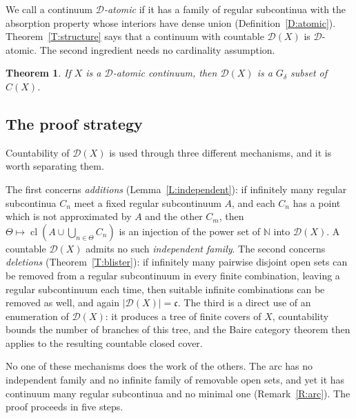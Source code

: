 \documentclass[11pt,reqno]{amsart}
\theoremstyle{plain}
\newtheorem{theorem}{Theorem}[section]
\theoremstyle{definition}
\theoremstyle{remark}
\newcommand{\D}{\mathcal{D}}
\newcommand{\cl}{\operatorname{cl}}
\newcommand{\N}{\mathbb{N}}
\newcommand{\cc}{\mathfrak{c}}
\begin{document}
We call a continuum \emph{$\D$-atomic} if it has a family of regular subcontinua with the absorption property whose interiors have dense union (Definition~\ref{D:atomic}). Theorem~\ref{T:structure} says that a continuum with countable $\D(X)$ is $\D$-atomic. The second ingredient needs no cardinality assumption.

\begin{theorem}\label{T:Gdelta}
If $X$ is a $\D$-atomic continuum, then $\D(X)$ is a $G_\delta$ subset of $C(X)$.
\end{theorem}

\subsection{The proof strategy}
Countability of $\D(X)$ is used through three different mechanisms, and it is worth separating them.

The first concerns \emph{additions} (Lemma~\ref{L:independent}): if infinitely many regular subcontinua $C_n$ meet a fixed regular subcontinuum $A$, and each $C_n$ has a point which is not approximated by $A$ and the other $C_m$, then $\Theta\mapsto\cl(A\cup\bigcup_{n\in\Theta}C_n)$ is an injection of the power set of $\N$ into $\D(X)$. A countable $\D(X)$ admits no such \emph{independent family}. The second concerns \emph{deletions} (Theorem~\ref{T:blister}): if infinitely many pairwise disjoint open sets can be removed from a regular subcontinuum in every finite combination, leaving a regular subcontinuum each time, then suitable infinite combinations can be removed as well, and again $|\D(X)|=\cc$. The third is a direct use of an enumeration of $\D(X)$: it produces a tree of finite covers of $X$, countability bounds the number of branches of this tree, and the Baire category theorem then applies to the resulting countable closed cover.

No one of these mechanisms does the work of the others. The arc has no independent family and no infinite family of removable open sets, and yet it has continuum many regular subcontinua and no minimal one (Remark~\ref{R:arc}). The proof proceeds in five steps.
\end{document}
